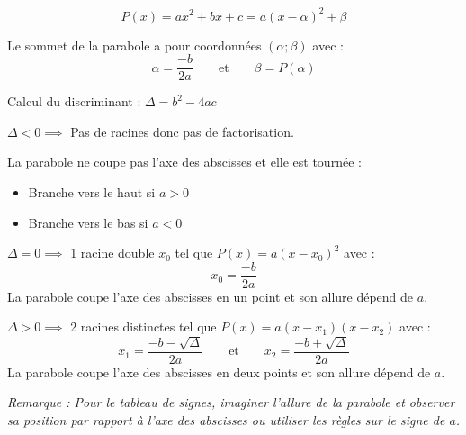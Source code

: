 \documentclass[a4paper,12pt]{article}
\begin{document}
\begin{center}
\end{center}
\bigskip

\[P(x) = ax^2+bx+c = a(x-\alpha)^2+\beta\]

Le sommet de la parabole a pour coordonnées $(\alpha;\beta)$ avec : 
\[\alpha = \dfrac{-b}{2a} \qquad\text{et}\qquad \beta = P(\alpha)\]


Calcul du discriminant : $\boxed{\Delta = b^2-4ac }$
\bigskip

$\boxed{\Delta < 0} \implies$ Pas de racines donc pas de factorisation.

La parabole ne coupe pas l'axe des abscisses et elle est tournée :
\begin{itemize}
  \item Branche vers le haut si $a>0$
  \item Branche vers le bas si $a<0$
\end{itemize}
\bigskip

$\boxed{\Delta = 0} \implies$ 1 racine double $x_0$ tel que 
$P(x) = a(x-x_0)^2$ avec :
\[
x_0=\dfrac{-b}{2a}
\]
La parabole coupe l'axe des abscisses en un point et son allure dépend de $a$.
\bigskip

$\boxed{\Delta > 0} \implies$ 2 racines distinctes tel que $ P(x) = a(x-x_1)(x-x_2)$ avec :
\[
x_1=\dfrac{-b-\sqrt{\Delta}}{2a} \qquad\text{et}\qquad x_2=\dfrac{-b+\sqrt{\Delta}}{2a}
\]
La parabole coupe l'axe des abscisses en deux points et son allure dépend de $a$.
\bigskip

\textit{Remarque : Pour le tableau de signes, imaginer l'allure de la parabole et observer sa position par rapport à l'axe des abscisses ou utiliser les règles sur le signe de $a$.}
\end{document}
